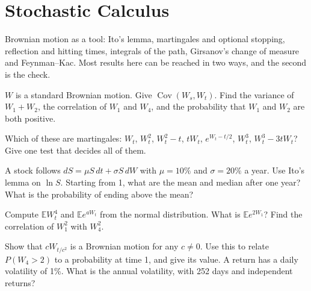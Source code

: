 \chapter{Stochastic Calculus}\label{ch:iv1:stochastic-calculus}

\begin{ivtrains}
Brownian motion as a tool: Ito's lemma, martingales and optional stopping, reflection and hitting times, integrals of the path, Girsanov's change of measure and Feynman--Kac. Most results here can be reached in two ways, and the second is the check.
\end{ivtrains}

\begin{question}\label{iq:iv1:stochastic-calculus:1}
$W$ is a standard Brownian motion. Give $\operatorname{Cov}(W_s, W_t)$. Find the variance of $W_1 + W_2$, the correlation of $W_1$ and $W_4$, and the probability that $W_1$ and $W_2$ are both positive.
\end{question}

\begin{question}\label{iq:iv1:stochastic-calculus:2}
Which of these are martingales: $W_t$, $W_t^2$, $W_t^2 - t$, $tW_t$, $e^{W_t - t/2}$, $W_t^3$, $W_t^3 - 3tW_t$? Give one test that decides all of them.
\end{question}

\begin{question}\label{iq:iv1:stochastic-calculus:3}
A stock follows $dS = \mu S\,dt + \sigma S\,dW$ with $\mu = 10\%$ and $\sigma = 20\%$ a year. Use Ito's lemma on $\ln S$. Starting from 1, what are the mean and median after one year? What is the probability of ending above the mean?
\end{question}

\begin{question}\label{iq:iv1:stochastic-calculus:4}
Compute $\mathbb{E}W_t^4$ and $\mathbb{E}e^{aW_t}$ from the normal distribution. What is $\mathbb{E}e^{2W_1}$? Find the correlation of $W_1^2$ with $W_4^2$.
\end{question}

\begin{question}\label{iq:iv1:stochastic-calculus:5}
Show that $cW_{t/c^2}$ is a Brownian motion for any $c \ne 0$. Use this to relate $P(W_4 > 2)$ to a probability at time 1, and give its value. A return has a daily volatility of 1\%. What is the annual volatility, with 252 days and independent returns?
\end{question}

